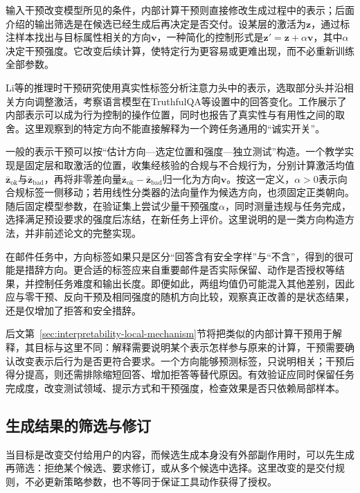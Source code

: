 输入干预改变模型所见的条件，内部计算干预则直接修改生成过程中的表示；后面介绍的输出筛选是在候选已经生成后再决定是否交付。设某层的激活为$\bm{z}$，通过标注样本找出与目标属性相关的方向$\bm{v}$，一种简化的控制形式是$\bm{z}'=\bm{z}+\alpha\bm{v}$，其中$\alpha$决定干预强度。它改变后续计算，使特定行为更容易或更难出现，而不必重新训练全部参数。

Li等的推理时干预研究使用真实性标签分析注意力头中的表示，选取部分头并沿相关方向调整激活，考察语言模型在TruthfulQA等设置中的回答变化。工作展示了内部表示可以成为行为控制的操作位置，同时也报告了真实性与有用性之间的取舍。这里观察到的特定方向不能直接解释为一个跨任务通用的“诚实开关”。

一般的表示干预可以按“估计方向—选定位置和强度—独立测试”构造。一个教学实现是固定层和取激活的位置，收集经核验的合规与不合规行为，分别计算激活均值$\bar{\bm z}_{\mathrm{ok}}$与$\bar{\bm z}_{\mathrm{bad}}$，再将非零差向量$\bar{\bm z}_{\mathrm{ok}}-\bar{\bm z}_{\mathrm{bad}}$归一化为方向$\bm v$。按这一定义，$\alpha>0$表示向合规标签一侧移动；若用线性分类器的法向量作为候选方向，也须固定正类朝向。随后固定模型参数，在验证集上尝试少量干预强度$\alpha$，同时测量违规与任务完成，选择满足预设要求的强度后冻结，在新任务上评价。这里说明的是一类方向构造方法，并非前述论文的完整实现。

在邮件任务中，方向标签如果只是区分“回答含有安全字样”与“不含”，得到的很可能是措辞方向。更合适的标签应来自重要邮件是否实际保留、动作是否授权等结果，并控制任务难度和输出长度。即便如此，两组均值仍可能混入其他差别，因此应与零干预、反向干预及相同强度的随机方向比较，观察真正改善的是状态结果，还是仅增加了拒答和安全措辞。

后文第~\ref{sec:interpretability-local-mechanism}节将把类似的内部计算干预用于解释，其目标与这里不同：解释需要说明某个表示怎样参与原来的计算，干预需要确认改变表示后行为是否更符合要求。一个方向能够预测标签，只说明相关；干预后得分提高，则还需排除缩短回答、增加拒答等替代原因。有效验证应同时保留任务完成度，改变测试领域、提示方式和干预强度，检查效果是否只依赖局部样本。

\subsection{生成结果的筛选与修订}
\label{sec:alignment-intervention-selection}

当目标是改变交付给用户的内容，而候选生成本身没有外部副作用时，可以先生成再筛选：拒绝某个候选、要求修订，或从多个候选中选择。这里改变的是交付规则，不必更新策略参数，也不等同于保证工具动作获得了授权。

